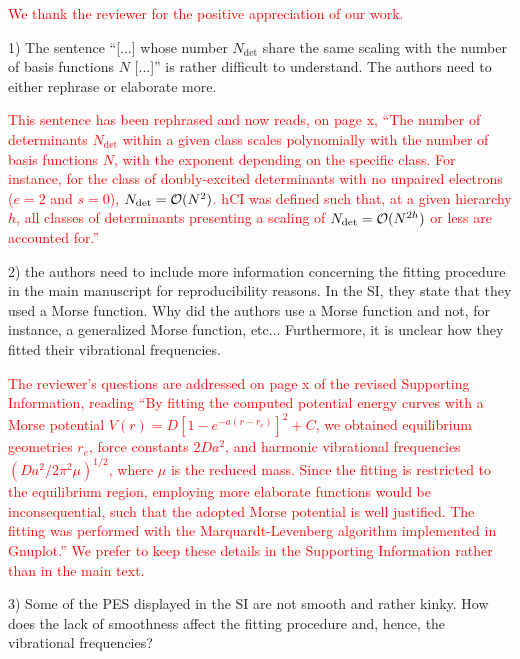 \documentclass[10pt]{letter}
\newcommand{\alert}[1]{\textcolor{red}{#1}}
\newcommand{\Ndet}{N_\text{det}}
\begin{document}
\begin{letter}
\alert{
We thank the reviewer for the positive appreciation of our work.
}

{1) The sentence ``[...] whose number $\Ndet$ share the same scaling with the number of basis functions $N$ [...]'' is rather difficult to understand. The authors need to either rephrase or elaborate more.
}

\alert{
This sentence has been rephrased and now reads, on page x,
``The number of determinants $\Ndet$ within a given class scales polynomially with the number of basis functions $N$, with the exponent depending on the specific class.
For instance, for the class of doubly-excited determinants with no unpaired electrons ($e=2$ and $s=0$), $\Ndet = \order*{N^2}$.
hCI was defined such that, at a given hierarchy $h$, all classes of determinants presenting a scaling of $\Ndet = \order*{N^{2h}}$ or less are accounted for.''
}

{2) the authors need to include more information concerning the fitting procedure in the main manuscript for reproducibility reasons. In the SI, they state that they used a Morse function. Why did the authors use a Morse function and not, for instance, a generalized Morse function, etc... Furthermore, it is unclear how they fitted their vibrational frequencies.
}

\alert{
The reviewer's questions are addressed on page x of the revised Supporting Information, reading
``By fitting the computed potential energy curves with a Morse potential $V(r) = D [1 - e^{-a(r-r_e)}]^2 + C $,
we obtained equilibrium geometries $r_e$, force constants $2Da^2$, and harmonic vibrational frequencies $\left( Da^2/2\pi^2\mu \right)^{1/2}$,
where $\mu$ is the reduced mass.
Since the fitting is restricted to the equilibrium region, employing more elaborate functions would be inconsequential, such that the adopted Morse potential is well justified.
The fitting was performed with the Marquardt-Levenberg algorithm implemented in Gnuplot.''
We prefer to keep these details in the Supporting Information rather than in the main text.
}

{3) Some of the PES displayed in the SI are not smooth and rather kinky. How does the lack of smoothness affect the fitting procedure and, hence, the vibrational frequencies?
}


\end{letter}
\end{document}
